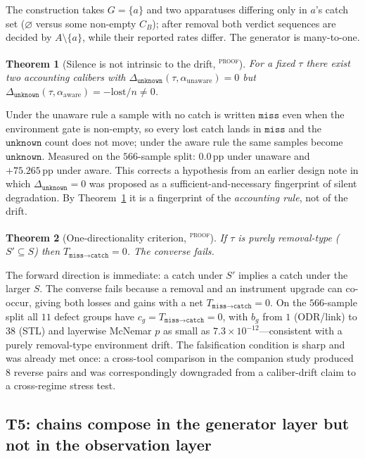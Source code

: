 \documentclass{article}
\newtheorem{theorem}{Theorem}
\newcommand{\catch}{\texttt{catch}}
\newcommand{\miss}{\texttt{miss}}
\newcommand{\unk}{\texttt{unknown}}
\newcommand{\pp}{\,\mathrm{pp}}
\newcommand{\evtag}[1]{\textsuperscript{\textsc{#1}}}
\begin{document}
The construction takes $G=\{a\}$ and two apparatuses differing only in $a$'s catch set ($\varnothing$ versus
some non-empty $C_B$); after removal both verdict sequences are decided by $A\setminus\{a\}$, while their
reported rates differ. The generator is many-to-one.

\begin{theorem}[Silence is not intrinsic to the drift, \evtag{proof}]
\label{thm:T3}
For a fixed $\tau$ there exist two accounting calibers with
$\Delta_{\unk}(\tau,\alpha_{\text{unaware}})=0$ but
$\Delta_{\unk}(\tau,\alpha_{\text{aware}})=-\mathrm{lost}/n\neq0$.
\end{theorem}

Under the unaware rule a sample with no catch is written $\miss$ even when the environment gate is
non-empty, so every lost catch lands in $\miss$ and the $\unk$ count does not move; under the aware rule the
same samples become $\unk$. Measured on the $566$-sample split: $0.0\pp$ under unaware and $+75.265\pp$
under aware. This corrects a hypothesis from an earlier design note in which $\Delta_{\unk}=0$ was proposed
as a sufficient-and-necessary fingerprint of silent degradation. By Theorem~\ref{thm:T3} it is a
fingerprint of the \emph{accounting rule}, not of the drift.

\begin{theorem}[One-directionality criterion, \evtag{proof}]
\label{thm:T4}
If $\tau$ is purely removal-type ($S'\subseteq S$) then $T_{\miss\to\catch}=0$. The converse fails.
\end{theorem}

The forward direction is immediate: a catch under $S'$ implies a catch under the larger $S$. The converse
fails because a removal and an instrument upgrade can co-occur, giving both losses and gains with a net
$T_{\miss\to\catch}=0$. On the $566$-sample split all $11$ defect groups have
$c_g=T_{\miss\to\catch}=0$, with $b_g$ from $1$ (ODR/link) to $38$ (STL) and layerwise McNemar $p$ as small
as $7.3\times10^{-12}$---consistent with a purely removal-type environment drift. The falsification
condition is sharp and was already met once: a cross-tool comparison in the companion study produced $8$
reverse pairs and was correspondingly downgraded from a caliber-drift claim to a cross-regime stress test.

\subsection{T5: chains compose in the generator layer but not in the observation layer}
\label{sec:T5}
\end{document}
